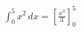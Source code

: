 \documentclass[preview]{standalone}
\begin{document}
\begin{align*}
\int_{0}^{5} x^2\,dx = \left[\frac{x^3}{3}\right]_{0}^{5}
\end{align*}
\end{document}
